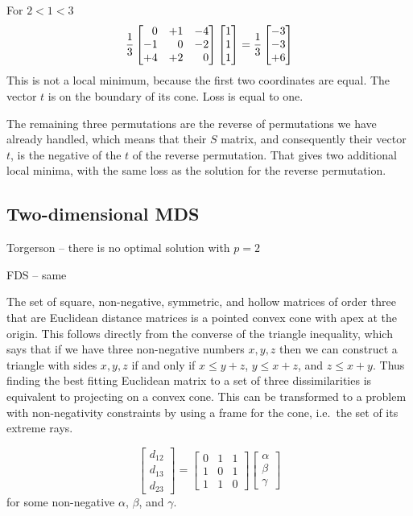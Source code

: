 \documentclass[
  12pt,
  letterpaper,
  DIV=11,
  numbers=noendperiod]{scrartcl}
\begin{document}
For \(2<1<3\) \[
\frac13\begin{bmatrix}
\hfill 0&+1&-4\\
-1&\hfill 0&-2\\
+4&+2&\hfill 0
\end{bmatrix}
\begin{bmatrix}
1\\
1\\
1
\end{bmatrix}=
\frac13\begin{bmatrix}
-3\\
-3\\
+6
\end{bmatrix}
\] This is not a local minimum, because the first two coordinates are
equal. The vector \(t\) is on the boundary of its cone. Loss is equal to
one.

The remaining three permutations are the reverse of permutations we have
already handled, which means that their \(S\) matrix, and consequently
their vector \(t\), is the negative of the \(t\) of the reverse
permutation. That gives two additional local minima, with the same loss
as the solution for the reverse permutation.

\subsection{Two-dimensional MDS}\label{two-dimensional-mds}

Torgerson -- there is no optimal solution with \(p = 2\)

FDS -- same

The set of square, non-negative, symmetric, and hollow matrices of order
three that are Euclidean distance matrices is a pointed convex cone with
apex at the origin. This follows directly from the converse of the
triangle inequality, which says that if we have three non-negative
numbers \(x,y,z\) then we can construct a triangle with sides \(x,y,z\)
if and only if \(x\leq y+z\), \(y\leq x+z\), and \(z\leq x+y\). Thus
finding the best fitting Euclidean matrix to a set of three
dissimilarities is equivalent to projecting on a convex cone. This can
be transformed to a problem with non-negativity constraints by using a
frame for the cone, i.e.~the set of its extreme rays.

\[
\begin{bmatrix}
d_{12}\\
d_{13}\\
d_{23}
\end{bmatrix}=
\begin{bmatrix}
0&1&1\\
1&0&1\\
1&1&0
\end{bmatrix}
\begin{bmatrix}
\alpha\\
\beta\\
\gamma
\end{bmatrix}
\] for some non-negative \(\alpha\), \(\beta\), and \(\gamma\).
\end{document}
